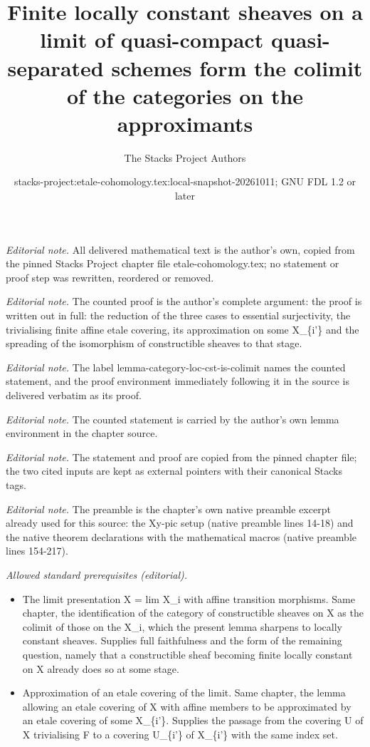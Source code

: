 \documentclass[10pt,a4paper]{amsart}
\title{Finite locally constant sheaves on a limit of quasi-compact quasi-separated schemes form the colimit of the categories on the approximants}
\author{The Stacks Project Authors}
\date{stacks-project:etale-cohomology.tex:local-snapshot-20261011; GNU FDL 1.2 or later}
\theoremstyle{plain}
\theoremstyle{definition}
\theoremstyle{remark}
\numberwithin{equation}{subsection}
\begin{document}
\maketitle
\noindent\textit{Editorial note.} All delivered mathematical text is the author's own, copied from the pinned Stacks Project chapter file etale-cohomology.tex; no statement or proof step was rewritten, reordered or removed.\par\medskip
\noindent\textit{Editorial note.} The counted proof is the author's complete argument: the proof is written out in full: the reduction of the three cases to essential surjectivity, the trivialising finite affine etale covering, its approximation on some X\_\{i'\} and the spreading of the isomorphism of constructible sheaves to that stage.\par\medskip
\noindent\textit{Editorial note.} The label lemma-category-loc-cst-is-colimit names the counted statement, and the proof environment immediately following it in the source is delivered verbatim as its proof.\par\medskip
\noindent\textit{Editorial note.} The counted statement is carried by the author's own lemma environment in the chapter source.\par\medskip
\noindent\textit{Editorial note.} The statement and proof are copied from the pinned chapter file; the two cited inputs are kept as external pointers with their canonical Stacks tags.\par\medskip
\noindent\textit{Editorial note.} The preamble is the chapter's own native preamble excerpt already used for this source: the Xy-pic setup (native preamble lines 14-18) and the native theorem declarations with the mathematical macros (native preamble lines 154-217).\par\medskip
\noindent\textit{Allowed standard prerequisites (editorial).}\begin{itemize}
\item The limit presentation X = lim X\_i with affine transition morphisms. Same chapter, the identification of the category of constructible sheaves on X as the colimit of those on the X\_i, which the present lemma sharpens to locally constant sheaves. Supplies full faithfulness and the form of the remaining question, namely that a constructible sheaf becoming finite locally constant on X already does so at some stage.
\item Approximation of an etale covering of the limit. Same chapter, the lemma allowing an etale covering of X with affine members to be approximated by an etale covering of some X\_\{i'\}. Supplies the passage from the covering U of X trivialising F to a covering U\_\{i'\} of X\_\{i'\} with the same index set.
\end{itemize}\medskip
\end{document}
